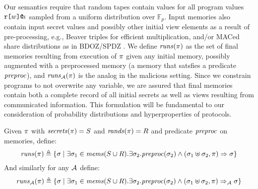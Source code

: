Our semantics require that random tapes contain values for all program
values $\texttt{r[}w\texttt{]}\texttt{@}\iota$ sampled from a uniform distribution
over $\mathbb{F}_p$. Input memories also contain input secret values
and possibly other initial view elements as a result of
pre-processing, e.g., Beaver triples for efficient multiplication,
and/or MACed share distributions as in BDOZ/SPDZ
\cite{evans2018pragmatic,10.1007/978-3-030-68869-1_3}. We define
$\mathit{runs}(\pi)$ as the set of final memories resulting from execution
of $\pi$ given any initial memory, possibly augmented with a
preprocessed memory (a memory that satsfies a predicate $\mathit{preproc}$),
and $\mathit{runs}_{\mathcal{A}}(\pi)$ is the analog in the malicious setting. Since we
constrain programs to not overwrite any variable, we are assured that
final memories contain both a complete record of all initial secrets
as well as views resulting from communicated information. This
formulation will be fundamental to our consideration of probability
distributions and hyperproperties of protocols.
\begin{definition}
  \label{def-runs}
  Given $\pi$ with $\mathit{secrets}(\pi) = S$ and $\mathit{rands}(\pi) = R$ and
  predicate $\mathit{preproc}$ on memories, define:
  $$
  \begin{array}{c}
    \mathit{runs}(\pi) \triangleq 
    \{ \sigma \mid \exists \sigma_1 \in \mathit{mems}(S \cup R) . 
    \exists \sigma_2 . \mathit{preproc}(\sigma_2) \wedge
    (\sigma_1 \uplus \sigma_2,\pi) \Rightarrow \sigma \}
  \end{array}
  $$
  And similarly for any $\mathcal{A}$ define:
  $$
  \begin{array}{c}
    \mathit{runs}_{\mathcal{A}}(\pi) \triangleq 
    \{ \sigma \mid \exists \sigma_1 \in \mathit{mems}(S \cup R) . 
    \exists \sigma_2 . \mathit{preproc}(\sigma_2) \wedge
    (\sigma_1 \uplus \sigma_2,\pi) \Rightarrow_{\mathcal{A}} \sigma \}
  \end{array}
  $$
\end{definition}

